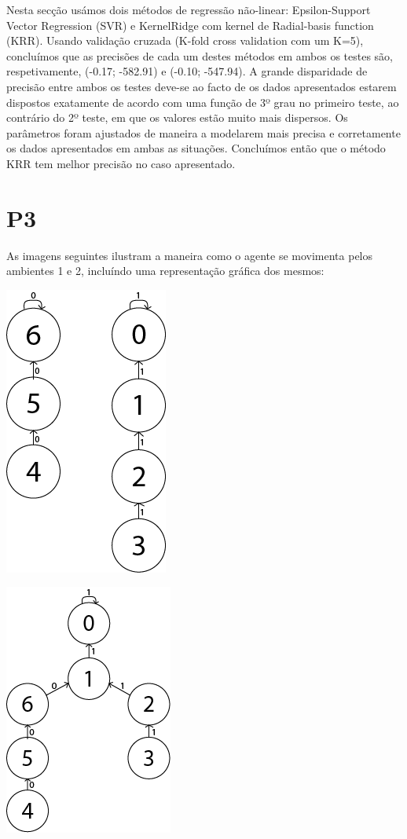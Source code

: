 \documentclass[11pt,twocolumn]{article}
\begin{document}
Nesta secção usámos dois métodos de regressão não-linear: Epsilon-Support Vector Regression (SVR) e KernelRidge com kernel de Radial-basis function (KRR).
Usando validação cruzada (K-fold cross validation com um K=5), concluímos que as precisões de cada um destes métodos em ambos os testes são, respetivamente, (-0.17; -582.91) e (-0.10; -547.94).
A grande disparidade de precisão entre ambos os testes deve-se ao facto de os dados apresentados estarem dispostos exatamente de acordo com uma função de 3º grau no primeiro teste,
ao contrário do 2º teste, em que os valores estão muito mais dispersos.
Os parâmetros foram ajustados de maneira a modelarem mais precisa e corretamente os dados apresentados em ambas as situações.
Concluímos então que o método KRR tem melhor precisão no caso apresentado.

\section*{P3}

As imagens seguintes ilustram a maneira como o agente se movimenta pelos ambientes 1 e 2, incluíndo uma representação gráfica dos mesmos:
	
\begin{center}
    \includegraphics[scale=0.4]{Trajetoria1.png}
\end{center}

\begin{center}
    \includegraphics[scale=0.4]{Trajetoria2.png}
\end{center}
\end{document}
